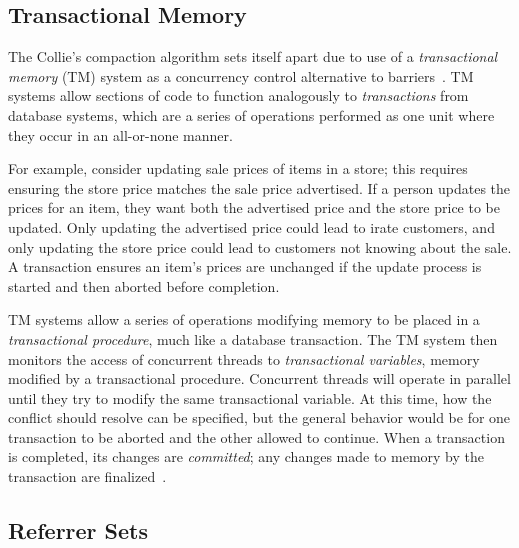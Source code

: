 \documentclass{sig-alternate}
\begin{document}
\subsection{Transactional Memory}
\label{sec:collieTM}

The Collie's compaction algorithm sets itself apart due to use 
of a \emph{transactional memory} (TM) system as a concurrency control 
alternative to barriers~\cite{Iyengar:Collie}. TM systems allow
sections of code to function 
analogously to \emph{transactions} from database systems, 
which are a series of operations performed as one unit where 
they occur in an all-or-none manner.

For example, consider updating sale prices of items in a store; this requires
ensuring the store price matches the sale price advertised. 
If a person updates the prices for an item, they want both the
advertised price and the store price to be updated. Only updating the
advertised price could lead to irate customers, and only updating the
store price could lead to customers not knowing about the sale. A transaction
ensures an item's prices are unchanged if the update process 
is started and then aborted before completion.

TM systems allow a series
of operations modifying memory to be placed in
a \emph{transactional procedure}, much like a database transaction.
The TM system then monitors the access of concurrent threads to \emph{transactional variables},
memory modified by a transactional procedure.
Concurrent threads will operate in parallel until they try to modify
the same transactional variable. At this time, how 
the conflict should resolve can be specified, but the general behavior would be for one transaction
to be aborted and the other allowed to continue.
When a transaction is completed, its changes are \emph{committed}; any changes 
made to memory by the transaction are finalized~\cite{wiki:transactional-memory}.


\subsection{Referrer Sets}
\label{sec:collieReferrerSets}
\end{document}
